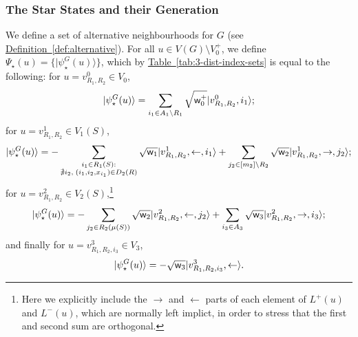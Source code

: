 \documentclass{theoretics}
\newcommand{\tabl}[1]{\hyperref[tab:#1]{Table~\ref*{tab:#1}}}
\newcommand{\defin}[1]{\hyperref[def:#1]{Definition~\ref*{def:#1}}}
\def\ket#1{{\lvert}#1\rangle}
\renewcommand{\>}{\rangle}
\newcommand{\<}{\langle}
\renewcommand{\(}{\left(}
\renewcommand{\)}{\right)}
\def\w{{\sf w}}
\begin{document}
\subsubsection{The Star States and their Generation}\label{sec:3-dist-star-states}

We define a set of alternative neighbourhoods for $G$ (see \defin{alternative}). 
For all $u\in V(G)\setminus V_0^+$, we define $\Psi_\star(u)=\{\ket{\psi_\star^G(u)}\}$, which by \tabl{3-dist-index-sets} is equal to the following: for $u=v_{R_1,R_2}^0 \in V_0$,
\begin{equation}
	\ket{\psi_\star^G(u)} = \sum_{i_1 \in A_1 \setminus R_1} \sqrt{\w_0^+}\ket{v_{R_1,R_2}^0,i_1};\label{eq:3-star-v0}
\end{equation}
for $u=v_{R_1,R_2}^1 \in V_1(S)$,
\begin{equation}
	\ket{\psi_\star^G(u)} = -\sum_{\substack{i_1 \in R_1(S):\\ \nexists i_2,\; (i_1,i_2,x_{i_1}) \in D_2(R)}} \sqrt{\w_1}\ket{v_{R_1,R_2}^1,\leftarrow,i_1} + \sum_{j_2 \in [m_2] \setminus R_2} \sqrt{\w_2}\ket{v_{R_1,R_2}^1,\rightarrow,j_2};\label{eq:3-star-v1}
\end{equation}
for $u=v_{R_1,R_2}^2 \in V_2(S)$,\footnote{Here we explicitly include the $\rightarrow$ and $\leftarrow$ parts of each element of $L^+(u)$ and $L^-(u)$, which are normally left implict, in order to stress that the first and second sum are orthogonal.}
\begin{equation}
	\ket{\psi_\star^G(u)} = -\sum_{\substack{j_2 \in R_2(\mu(S))}} \sqrt{\w_2}\ket{v_{R_1,R_2}^2,\leftarrow,j_2} + \sum_{i_3 \in A_3} \sqrt{\w_3}\ket{v_{R_1,R_2}^2,\rightarrow,i_3};\label{eq:3-star-v2}
\end{equation}
and finally for $u=v_{R_1,R_2,i_3}^3 \in V_3$,
\begin{equation}
	\ket{\psi_\star^G(u)} = -\sqrt{\w_3}\ket{v_{R_1,R_2,i_3}^3,\leftarrow}.\label{eq:3-star-v3}
\end{equation}
\end{document}
